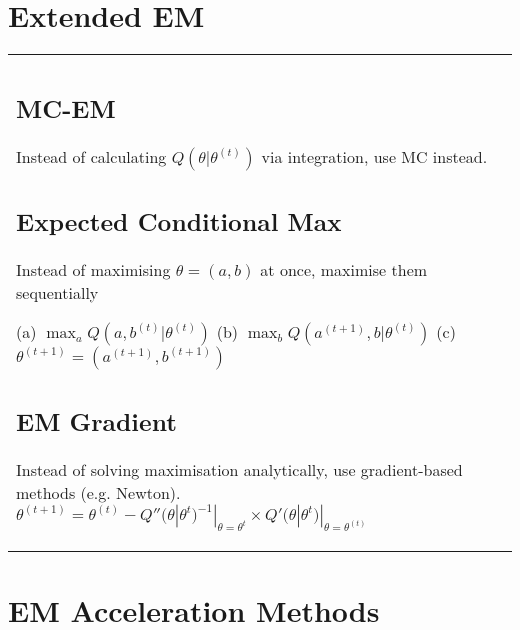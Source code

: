 \section{Extended EM}

\begin{tabulary}{\textwidth}{l L}
\subsection{MC-EM}

Instead of calculating $Q(\theta|\theta^{(t)})$ via integration, use MC instead.

\subsection{Expected Conditional Max}

Instead of maximising $\theta=(a, b)$ at once, maximise them sequentially

(a) $\max_a Q(a, b^{(t)}|\theta^{(t)})$
(b) $\max_b Q(a^{(t+1)}, b|\theta^{(t)})$
(c) $\theta^{(t+1)} = (a^{(t+1)}, b^{(t+1)})$

\subsection{EM Gradient}

Instead of solving maximisation analytically, use gradient-based methods (e.g. Newton).
$\theta^{(t+1)}=\theta^{(t)} - Q''(\theta|\theta^{t})^{-1}|_{\theta=\theta^{t}}\times Q'(\theta|\theta^{t})|_{\theta=\theta^{(t)}}$

\end{tabulary}

\section{EM Acceleration Methods}

